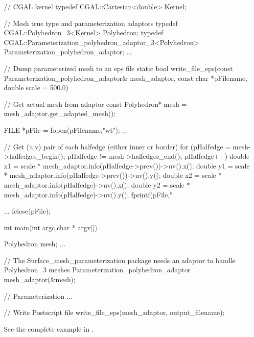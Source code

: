 \begin{ccExampleCode}

// CGAL kernel
typedef CGAL::Cartesian<double>                         Kernel;

// Mesh true type and parameterization adaptors
typedef CGAL::Polyhedron_3<Kernel>                      Polyhedron;
typedef CGAL::Parameterization_polyhedron_adaptor_3<Polyhedron>
                                                        Parameterization_polyhedron_adaptor;
...

// Dump parameterized mesh to an eps file
static bool write_file_eps(const Parameterization_polyhedron_adaptor& mesh_adaptor,
                           const char *pFilename,
                           double scale = 500.0)
{
    // Get actual mesh from adaptor
    const Polyhedron* mesh = mesh_adaptor.get_adapted_mesh();

    FILE *pFile = fopen(pFilename,"wt");
    ...

    // Get (u,v) pair of each halfedge (either inner or border)
    for (pHalfedge = mesh->halfedges_begin();
         pHalfedge != mesh->halfedges_end();
         pHalfedge++)
    {
        double x1 = scale * mesh_adaptor.info(pHalfedge->prev())->uv().x();
        double y1 = scale * mesh_adaptor.info(pHalfedge->prev())->uv().y();
        double x2 = scale * mesh_adaptor.info(pHalfedge)->uv().x();
        double y2 = scale * mesh_adaptor.info(pHalfedge)->uv().y();
        fprintf(pFile,"%
    }

    ...
    fclose(pFile);
}

int main(int argc,char * argv[])
{
    Polyhedron mesh;
    ...

    // The Surface_mesh_parameterization package needs an adaptor to handle Polyhedron_3 meshes
    Parameterization_polyhedron_adaptor mesh_adaptor(&mesh);

    // Parameterization
    ...

    // Write Postscript file
    write_file_eps(mesh_adaptor, output_filename);
}

\end{ccExampleCode}

See the complete example in .